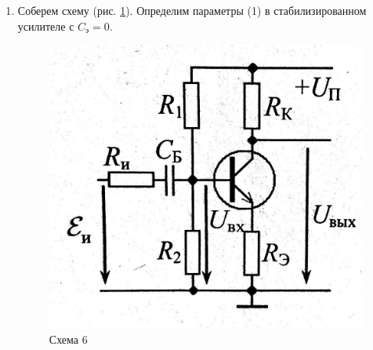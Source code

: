 \documentclass[a4paper]{article}
\begin{document}
\begin{enumerate}
            \begin{itemize}
                \item $T \approx 15 \cdot \frac{1}{2 \pi f_н}$, $\nu_н \ap 153.8\; Гц$ \par 
                    По формуле (\ref{tau}) выберем 2 точки с графика на рис. \ref{f_n}:
                
                \item $T \approx 15 \cdot \frac{1}{2 \pi f_в}$, $\nu_в \ap 250\; кГц$ \par
                    По формуле (\ref{tau}) выберем 2 точки с графика на рис. \ref{f_v}:
                    
            \end{itemize}



    \item Соберем схему (рис. \ref{sch6}). Определим параметры (1) в стабилизированном усилителе с $C_э = 0$.

    \begin{figure}[H]
        \begin{center}
            \includegraphics[scale = 0.15]{6_1.jpg}
            \caption{Схема 6}
            \label{sch6}
        \end{center}
    \end{figure}


\end{enumerate}
\end{document}

